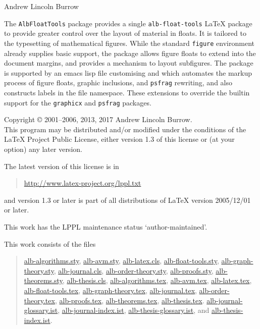 \documentclass[11pt,a4paper,oneside,titlepage]{alb-latex}
\begin{document}


\begin{albTitlePage}


  Andrew Lincoln Burrow


  The \texttt{AlbFloatTools} package provides a single
  \texttt{alb-float-tools} \LaTeX{} package to provide greater control
  over the layout of material in floats.  It is tailored to the
  typesetting of mathematical figures.  While the standard
  \texttt{figure} environment already supplies basic support, the
  package allows figure floats to extend into the document margins, and
  provides a mechanism to layout subfigures.  The package is supported
  by an emacs lisp file customising \AUCTeX{} and \RefTeX{} which
  automates the markup process of figure floats, graphic inclusions, and
  \texttt{psfrag} rewriting, and also constructs labels in the file
  namespace.  These extensions to \AUCTeX{} override the builtin support
  for the \texttt{graphicx} and \texttt{psfrag} packages.



  Copyright \copyright{} 2001--2006, 2013, 2017 Andrew Lincoln Burrow.\\
  This program may be distributed and/or modified under the conditions
  of the \LaTeX{} Project Public License, either version 1.3 of this
  license or (at your option) any later version.

  \medskip{}

  The latest version of this license is in
  \begin{quote}
    \url{http://www.latex-project.org/lppl.txt}
  \end{quote}
  and version 1.3 or later is part of all distributions of LaTeX version
  2005/12/01 or later.

  \medskip{}

  This work has the LPPL maintenance status `author-maintained'.

  \medskip{}

  This work consists of the files
  \begin{quote}
    \begin{flushleft}
      \url{alb-algorithms.sty}, \url{alb-avm.sty}, \url{alb-latex.cls},
      \url{alb-float-tools.sty}, \url{alb-graph-theory.sty},
      \url{alb-journal.cls}, \url{alb-order-theory.sty},
      \url{alb-proofs.sty}, \url{alb-theorems.sty},
      \url{alb-thesis.cls}, \url{alb-algorithms.tex}, \url{alb-avm.tex},
      \url{alb-latex.tex}, \url{alb-float-tools.tex},
      \url{alb-graph-theory.tex}, \url{alb-journal.tex},
      \url{alb-order-theory.tex}, \url{alb-proofs.tex},
      \url{alb-theorems.tex}, \url{alb-thesis.tex}.
      \url{alb-journal-glossary.ist}, \url{alb-journal-index.ist},
      \url{alb-thesis-glossary.ist}, and \url{alb-thesis-index.ist}.
    \end{flushleft}
  \end{quote}



\end{albTitlePage}
\end{document}
